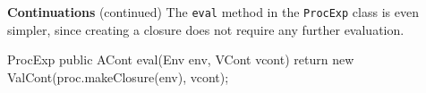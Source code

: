 \begin{minipage}[t]{\sw}
\slidenumber
\LARGE
{\bf Continuations} (continued)\exx
The \verb'eval' method in the \verb'ProcExp' class is even simpler,
since creating a closure does not require any further evaluation.
\Large
\begin{qv}
ProcExp
    public ACont eval(Env env, VCont vcont) {
        return new ValCont(proc.makeClosure(env), vcont);
    }
\end{qv}
\end{minipage}
